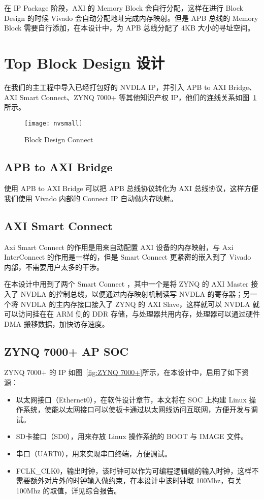 在 IP Package 阶段，AXI 的 Memory Block 会自行分配，这样在进行 Block Design 的时候 Vivado 会自动分配地址完成内存映射。但是 APB 总线的 Memory Block 需要自行添加，在本设计中，为 APB 总线分配了 4KB 大小的寻址空间。

\section{Top Block Design 设计}

在我们的主工程中导入已经打包好的 NVDLA IP，并引入 APB to AXI Bridge、AXI Smart Connect、ZYNQ 7000+ 等其他知识产权 IP，他们的连线关系如图~\ref{fig:Block Design Connect}所示。

\begin{figure}[!htbp]
    \centering
    \texttt{[image: nvsmall]}
    \caption{Block Design Connect}
    \label{fig:Block Design Connect}
\end{figure}

\subsection{APB to AXI Bridge}

使用 APB to AXI Bridge 可以把 APB 总线协议转化为 AXI 总线协议，这样方便我们使用 Vivado 内部的 Connect IP 自动做内存映射。

\subsection{AXI Smart Connect}

Axi Smart Connect 的作用是用来自动配置 AXI 设备的内存映射，与 Axi InterConnect 的作用是一样的，但是 Smart Connect 更紧密的嵌入到了 Vivado 内部，不需要用户太多的干涉。

在本设计中用到了两个 Smart Connect ，其中一个是将 ZYNQ 的 AXI Master 接入了 NVDLA 的控制总线，以便通过内存映射机制读写 NVDLA 的寄存器；另一个将 NVDLA 的主内存接口接入了 ZYNQ 的 AXI Slave，这样就可以 NVDLA 就可以访问挂在在 ARM 侧的 DDR 存储，与处理器共用内存，处理器可以通过硬件 DMA 搬移数据，加快访存速度。

\subsection{ZYNQ 7000+ AP SOC}

ZYNQ 7000+ 的 IP 如图~\ref{fig:ZYNQ 7000+}所示，在本设计中，启用了如下资源：

\begin{itemize}
    \item 以太网接口（Ethernet0），在软件设计章节，本文将在 SOC 上构建 Linux 操作系统，使能以太网接口可以使板卡通过以太网线访问互联网，方便开发与调试。
    \item SD卡接口（SD0），用来存放 Linux 操作系统的 BOOT 与 IMAGE 文件。
    \item 串口（UART0），用来实现串口终端，方便调试。
    \item FCLK\_CLK0，输出时钟，该时钟可以作为可编程逻辑端的输入时钟，这样不需要额外对片外的时钟输入做约束，在本设计中该时钟取 100Mhz，有关 100Mhz 的取值，详见综合报告。
\end{itemize}

